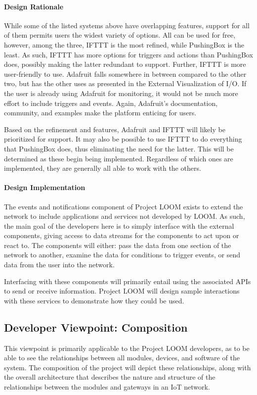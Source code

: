 \documentclass[onecolumn, draftclsnofoot,10pt, compsoc]{IEEEtran}
\begin{document}
\paragraph{Design Rationale}
    While some of the listed systems above have overlapping features, support for all of them permits users the widest variety of options. All can be used for free, however, among the three, IFTTT is the most refined, while PushingBox is the least. As such, IFTTT has more options for triggers and actions than PushingBox does, possibly making the latter redundant to support. Further, IFTTT is more user-friendly to use. Adafruit falls somewhere in between compared to the other two, but has the other uses as presented in the External Visualization of I/O. If the user is already using Adafruit for monitoring, it would not be much more effort to include triggers and events. Again, Adafruit's documentation, community, and examples make the platform enticing for users.

    Based on the refinement and features, Adafruit and IFTTT will likely be prioritized for support. It may also be possible to use IFTTT to do everything that PushingBox does, thus eliminating the need for the latter. This will be determined as these begin being implemented. Regardless of which ones are implemented, they are generally all able to work with the others.

\paragraph{Design Implementation}
    The events and notifications component of Project LOOM exists to extend the network to include applications and services not developed by LOOM. As such, the main goal of the developers here is to simply interface with the external components, giving access to data streams for the components to act upon or react to. The components will either: pass the data from one section of the network to another, examine the data for conditions to trigger events, or send data from the user into the network.

    Interfacing with these components will primarily entail using the associated APIs to send or receive information. Project LOOM will design sample interactions with these services to demonstrate how they could be used.






\subsection{Developer Viewpoint: Composition}
    This viewpoint is primarily applicable to the Project LOOM developers, as to be able to see the relationships between all modules, devices, and software of the system. The composition of the project will depict these relationships, along with the overall architecture that describes the nature and structure of the relationships between the modules and gateways in an IoT network.
\end{document}
